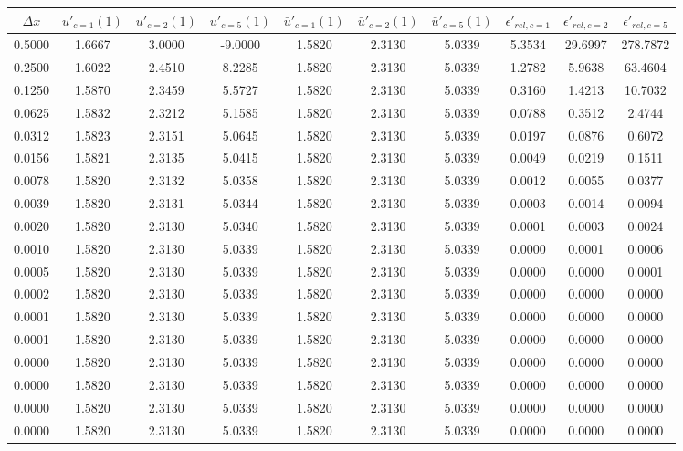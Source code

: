 \begin{tabular}{|c|c|c|c|c|c|c|c|c|c|}
\hline
\textbf{$\Delta x$}&\textbf{$u'_{c=1}(1)$}&\textbf{$u'_{c=2}(1)$}&\textbf{$u'_{c=5}(1)$}&\textbf{$\bar{u}'_{c=1}(1)$}&\textbf{$\bar{u}'_{c=2}(1)$}&\textbf{$\bar{u}'_{c=5}(1)$}&\textbf{$\epsilon'_{rel,c=1}$}&\textbf{$\epsilon'_{rel,c=2}$}&\textbf{$\epsilon'_{rel,c=5}$}\\\hline
0.5000&1.6667&3.0000&-9.0000&1.5820&2.3130&5.0339&5.3534&29.6997&278.7872\\\hline
0.2500&1.6022&2.4510&8.2285&1.5820&2.3130&5.0339&1.2782&5.9638&63.4604\\\hline
0.1250&1.5870&2.3459&5.5727&1.5820&2.3130&5.0339&0.3160&1.4213&10.7032\\\hline
0.0625&1.5832&2.3212&5.1585&1.5820&2.3130&5.0339&0.0788&0.3512&2.4744\\\hline
0.0312&1.5823&2.3151&5.0645&1.5820&2.3130&5.0339&0.0197&0.0876&0.6072\\\hline
0.0156&1.5821&2.3135&5.0415&1.5820&2.3130&5.0339&0.0049&0.0219&0.1511\\\hline
0.0078&1.5820&2.3132&5.0358&1.5820&2.3130&5.0339&0.0012&0.0055&0.0377\\\hline
0.0039&1.5820&2.3131&5.0344&1.5820&2.3130&5.0339&0.0003&0.0014&0.0094\\\hline
0.0020&1.5820&2.3130&5.0340&1.5820&2.3130&5.0339&0.0001&0.0003&0.0024\\\hline
0.0010&1.5820&2.3130&5.0339&1.5820&2.3130&5.0339&0.0000&0.0001&0.0006\\\hline
0.0005&1.5820&2.3130&5.0339&1.5820&2.3130&5.0339&0.0000&0.0000&0.0001\\\hline
0.0002&1.5820&2.3130&5.0339&1.5820&2.3130&5.0339&0.0000&0.0000&0.0000\\\hline
0.0001&1.5820&2.3130&5.0339&1.5820&2.3130&5.0339&0.0000&0.0000&0.0000\\\hline
0.0001&1.5820&2.3130&5.0339&1.5820&2.3130&5.0339&0.0000&0.0000&0.0000\\\hline
0.0000&1.5820&2.3130&5.0339&1.5820&2.3130&5.0339&0.0000&0.0000&0.0000\\\hline
0.0000&1.5820&2.3130&5.0339&1.5820&2.3130&5.0339&0.0000&0.0000&0.0000\\\hline
0.0000&1.5820&2.3130&5.0339&1.5820&2.3130&5.0339&0.0000&0.0000&0.0000\\\hline
0.0000&1.5820&2.3130&5.0339&1.5820&2.3130&5.0339&0.0000&0.0000&0.0000\\\hline
\end{tabular}
